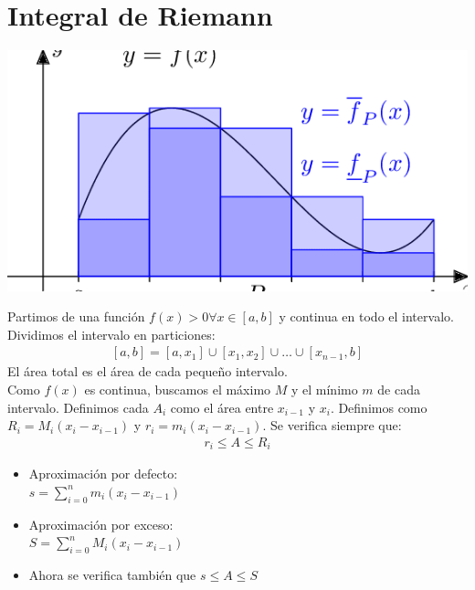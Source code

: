 \documentclass{article}
\begin{document}
\section{Integral de Riemann}
\begin{center}
    \includegraphics[scale=0.5]{../images/riemann.png}
\end{center}
Partimos de una función $f(x)>0 \forall x \in [a,b]$ y continua en todo el intervalo.\\
Dividimos el intervalo en particiones:
\begin{equation}
    \begin{split}
        [a,b]=[a,x_{1}] \cup [x_{1},x_{2}]\cup \dots\cup [x_{n-1}, b]
    \end{split}
\end{equation}
El área total es el área de cada pequeño intervalo.\\
Como $f(x)$ es continua, buscamos el máximo $M$ y el mínimo $m$ de cada intervalo. Definimos cada
$A_{i}$ como el área entre $x_{i-1}$ y $x_{i}$. Definimos como $R_{i}= M_{i} (x_{i}-x_{i-1})$ y
$r_{i} = m_{i}(x_{i}- x_{i-1})$. Se verifica siempre que:
\begin{equation}
    \begin{split}
        r_{i} \leq A \leq R_{i}
    \end{split}
\end{equation}
\begin{itemize}
    \item Aproximación por defecto:\\
    $s = \sum _{i=0}^n m_{i}(x_{i} - x_{i-1})$
    \item Aproximación por exceso:\\
    $S = \sum _{i=0} ^n M_{i}(x_{i}-x_{i-1})$
    \item Ahora se verifica también que $s \leq A \leq S$
\end{itemize}
\end{document}
